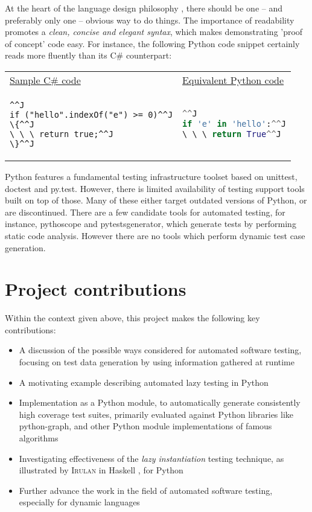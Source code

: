 At the heart of the language design philosophy \cite{Pep20ZenPython}, there should be one -- and preferably only one -- obvious way to do things. The importance of readability promotes a \emph{clean, concise and elegant syntax}, which makes demonstrating 'proof of concept' code easy.
\clearpage
For instance, the following Python code snippet certainly reads more fluently than its C\# counterpart:

\begin{tabularx}{\textwidth}{X X}
\underline{Sample C\# code} & \underline{Equivalent Python code} \\
\begin{lstlisting}[language=CSharp]^^J
if ("hello".indexOf("e") >= 0)^^J
\{^^J
\ \ \ return true;^^J
\}^^J
\end{lstlisting}
&
\begin{lstlisting}[language=python]^^J
if 'e' in 'hello':^^J
\ \ \ return True^^J
\end{lstlisting}
\end{tabularx}
Python features a fundamental testing infrastructure toolset based on \textsf{unittest}, \textsf{doctest} and \textsf{py.test}. However, there is limited availability of testing support tools built on top of those. Many of these either target outdated versions of Python, or are discontinued. There are a few candidate tools for automated testing, for instance, \textsf{pythoscope} and \textsf{pytestsgenerator}, which generate tests by performing static code analysis. However there are no tools which perform dynamic test case generation.
\section{Project contributions}
Within the context given above, this project makes the following key contributions:

\begin{itemize}
	\item A discussion of the possible ways considered for automated software testing, focusing on test data generation by using information gathered at runtime
	\item A motivating example describing automated lazy testing in Python
	\item Implementation as a Python module, to automatically generate consistently high coverage test suites, primarily evaluated against Python libraries like python-graph, and other Python module implementations of famous algorithms
	\item Investigating effectiveness of the \emph{lazy instantiation} testing technique, as illustrated by \textsc{Irulan} in Haskell \cite{Allwood2011}, for Python
	\item Further advance the work in the field of automated software testing, especially for dynamic languages
\end{itemize}


